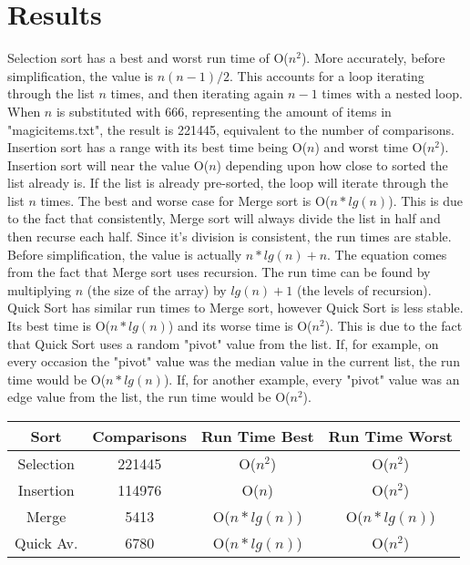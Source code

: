 \documentclass[letterpaper, 10pt,DIV=13]{scrartcl}
\begin{document}

\section{Results}
 Selection sort has a best and worst run time of O($n^2$). More accurately, before simplification, the value is $n(n-1)/2$. This accounts for a loop iterating through the list $n$ times, and then iterating again $n-1$ times with a nested loop. When $n$ is substituted with 666, representing the amount of items in "magicitems.txt", the result is 221445, equivalent to the number of comparisons. Insertion sort has a range with its best time being O($n$) and worst time O($n^2$). Insertion sort will near the value O($n$) depending upon how close to sorted the list already is. If the list is already pre-sorted, the loop will iterate through the list $n$ times. The best and worse case for Merge sort is O($n*lg(n)$). This is due to the fact that consistently, Merge sort will always divide the list in half and then recurse each half. Since it's division is consistent, the run times are stable. Before simplification, the value is actually $n*lg(n)+n$. The equation comes from the fact that Merge sort uses recursion. The run time can be found by multiplying $n$ (the size of the array) by $lg(n)+1$ (the levels of recursion). Quick Sort has similar run times to Merge sort, however Quick Sort is less stable. Its best time is O($n*lg(n)$) and its worse time is O($n^2$). This is due to the fact that Quick Sort uses a random "pivot" value from the list. If, for example, on every occasion the "pivot" value was the median value in the current list, the run time would be O($n*lg(n)$). If, for another example, every "pivot" value was an edge value from the list, the run time would be O($n^2$).

\begin{center}
\begin{tabular} { |c|c|c|c| }
    
\hline
     Sort & Comparisons & Run Time Best & Run Time Worst \\
\hline
\hline
     Selection & 221445 & O($n^2$) & O($n^2$)\\
\hline
     Insertion & 114976 & O($n$) & O($n^2$)\\
\hline
     Merge     & 5413  & O($n*lg(n)$) & O($n*lg(n)$)\\
\hline
     Quick Av. & 6780  & O($n*lg(n)$) & O($n^2$)\\
\hline
\end{tabular}
\end{center}
\pagebreak
\end{document}
